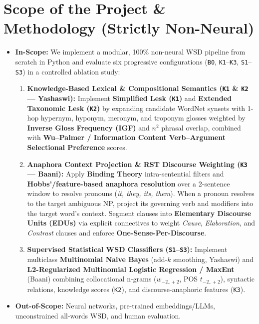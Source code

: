 \documentclass[11pt,a4paper]{article}
\begin{document}
\section{Scope of the Project \& Methodology (Strictly Non-Neural)}
\begin{itemize}
    \item \textbf{In-Scope:} We implement a modular, 100\% non-neural WSD pipeline from scratch in Python and evaluate six progressive configurations (\texttt{B0}, \texttt{K1}--\texttt{K3}, \texttt{S1}--\texttt{S3}) in a controlled ablation study:
    \begin{enumerate}
        \item \textbf{Knowledge-Based Lexical \& Compositional Semantics (\texttt{K1} \& \texttt{K2} --- Yashaswi):} Implement \textbf{Simplified Lesk (\texttt{K1})} and \textbf{Extended Taxonomic Lesk (\texttt{K2})} by expanding candidate WordNet synsets with 1-hop hypernym, hyponym, meronym, and troponym glosses weighted by \textbf{Inverse Gloss Frequency (IGF)} and $n^2$ phrasal overlap, combined with \textbf{Wu--Palmer / Information Content Verb--Argument Selectional Preference} scores.
        \item \textbf{Anaphora Context Projection \& RST Discourse Weighting (\texttt{K3} --- Baani):} Apply \textbf{Binding Theory} intra-sentential filters and \textbf{Hobbs'/feature-based anaphora resolution} over a 2-sentence window to resolve pronouns (\textit{it, they, its, them}). When a pronoun resolves to the target ambiguous NP, project its governing verb and modifiers into the target word's context. Segment clauses into \textbf{Elementary Discourse Units (EDUs)} via explicit connectives to weight \textit{Cause}, \textit{Elaboration}, and \textit{Contrast} clauses and enforce \textbf{One-Sense-Per-Discourse}.
        \item \textbf{Supervised Statistical WSD Classifiers (\texttt{S1}--\texttt{S3}):} Implement multiclass \textbf{Multinomial Naive Bayes} (add-$k$ smoothing, Yashaswi) and \textbf{L2-Regularized Multinomial Logistic Regression / MaxEnt} (Baani) combining collocational n-grams ($w_{-2..+2}$, POS $t_{-2..+2}$), syntactic relations, knowledge scores (\texttt{K2}), and discourse-anaphoric features (\texttt{K3}).
    \end{enumerate}
    \item \textbf{Out-of-Scope:} Neural networks, pre-trained embeddings/LLMs, unconstrained all-words WSD, and human evaluation.
\end{itemize}
\end{document}
